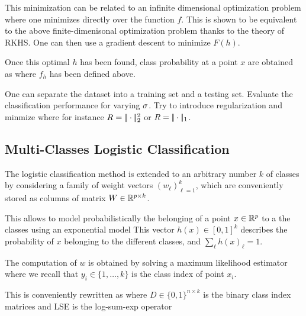 This minimization can be related to an infinite dimensional optimization
problem where one minimizes directly over the function $f$. This
is shown to be equivalent to the above finite-dimenisonal optimization problem
thanks to the theory of RKHS.
One can then use a gradient descent to minimize $F(h)$.


Once this optimal $h$ has been found, class probability at a point
$x$ are obtained as
where $f_h$ has been defined above.




One can separate the dataset into a training set and a testing set. Evaluate the classification performance
for varying $\sigma$. Try to introduce regularization and minmize
where for instance $R=|\!| \cdot |\!|_2^2$ or  $R=|\!| \cdot |\!|_1$.


\subsection{Multi-Classes Logistic Classification}

The logistic classification method is extended to an arbitrary number
$k$ of classes by considering a family of weight vectors $ ( w_\ell )_{\ell=1}^k $, which are conveniently stored as columns of matrix $W \in \mathbb{R}^{p \times k}$.

This allows to model probabilistically the belonging of a point $x \in \mathbb{R}^p $ to a
the classes using an exponential model
This vector $h(x) \in [0,1]^k $ describes the probability of $x$
belonging to the different classes, and $ \sum_\ell h(x)_\ell = 1 $.

The computation of $w$ is obtained by solving a maximum likelihood
estimator
where we recall that $y_i \in \{1,\ldots,k\}$ is the class index of
point $x_i$.

This is conveniently rewritten as
where $D \in \{0,1\}^{n \times k}$ is the binary class index matrices
and LSE is the log-sum-exp operator


